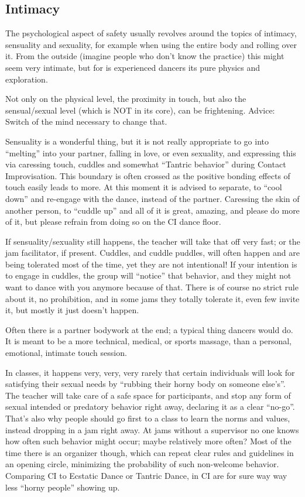 \subsection{Intimacy}\label{subsec:intimacy}

The psychological aspect of safety usually revolves around the topics of intimacy, sensuality and sexuality,
for example when using the entire body and rolling over it.
From the outside (imagine people who don't know the practice) this might seem very intimate, but for is experienced dancers its pure physics and exploration.

Not only on the physical level, the proximity in touch, but also the sensual/sexual level (which is NOT in its core), can be frightening.
Advice: Switch of the mind necessary to change that.

Sensuality is a wonderful thing, but it is not really appropriate to go into ``melting'' into your partner, falling in love, or even sexuality, and expressing this via caressing touch, cuddles and somewhat ``Tantric behavior'' during Contact Improvisation.
This boundary is often crossed as the positive bonding effects of touch easily leads to more.
At this moment it is advised to separate, to ``cool down'' and re-engage with the dance, instead of the partner.
Caressing the skin of another person, to ``cuddle up'' and all of it is great, amazing, and please do more of it, but please refrain from doing so on the CI dance floor.

If sensuality/sexuality still happens, the teacher will take that off very fast; or the jam facilitator, if present.
Cuddles, and cuddle puddles, will often happen and are being tolerated most of the time, yet they are not intentional!
If your intention is to engage in cuddles, the group will ``notice'' that behavior, and they might not want to dance with you anymore because of that.
There is of course no strict rule about it, no prohibition, and in some jams they totally tolerate it, even few invite it, but mostly it just doesn't happen.

Often there is a partner bodywork at the end; a typical thing dancers would do.
It is meant to be a more technical, medical, or sports massage, than a personal, emotional, intimate touch session.

In classes, it happens very, very, very rarely that certain individuals will look for satisfying their sexual needs by ``rubbing their horny body on someone else's''.
The teacher will take care of a safe space for participants, and stop any form of sexual intended or predatory behavior right away, declaring it as a clear ``no-go''.
That's also why people should go first to a class to learn the norms and values, instead dropping in a jam right away.
At jams without a supervisor no one knows how often such behavior might occur; maybe relatively more often?
Most of the time there is an organizer though, which can repeat clear rules and guidelines in an opening circle, minimizing the probability of such non-welcome behavior.
Comparing CI to Ecstatic Dance or Tantric Dance, in CI are for sure way way less ``horny people'' showing up.

